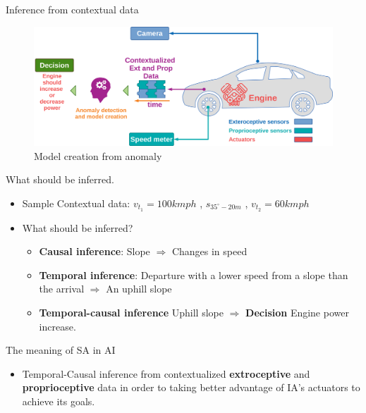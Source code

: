 \documentclass[unknownkeysallowed]{beamer}
\begin{document}
\begin{frame}{Inference from contextual data}
	\begin{figure}
		\includegraphics[scale=0.7]{ext-prp-brain.png}
		\caption{Model creation from anomaly}
	\end{figure}
\end{frame}

\begin{frame}{What should be inferred.}
	\begin{itemize}
		\item Sample Contextual data: $v_{t_1}=100kmph$ , $s_{35^{\circ}-20m}$ , $v_{t_2}=60kmph$
		\item What should be inferred?
		\begin{itemize}
			\item \textbf{Causal inference}: Slope $\Rightarrow$ Changes in speed
			\item \textbf{Temporal inference}: Departure with a lower speed from a slope than the arrival $\Rightarrow$ An uphill slope
\item \textbf{Temporal-causal inference} Uphill slope $\Rightarrow$ \textbf{Decision} Engine power increase.
		\end{itemize}
	\end{itemize}
\end{frame}

\begin{frame}{The meaning of SA in AI}
	\begin{itemize}
		\item Temporal-Causal inference from contextualized  \textbf{extroceptive} and \textbf{proprioceptive} data in order to taking better advantage of IA's actuators to achieve its goals.
	\end{itemize}
\end{frame}
\end{document}
